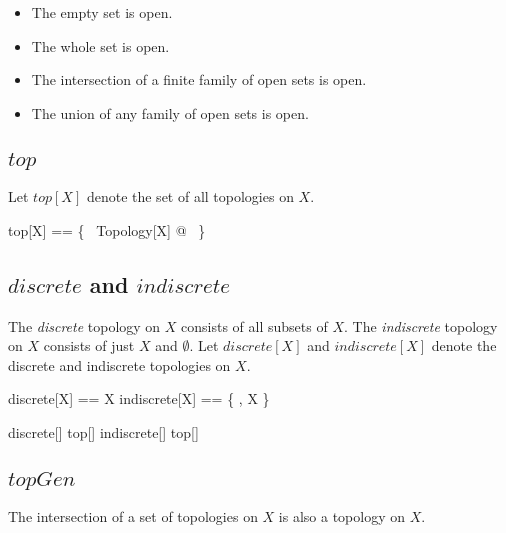 \documentclass[11pt, oneside]{article}
\begin{document}
\begin{itemize}
\item The empty set is open.
\item The whole set is open.
\item The intersection of a finite family of open sets is open.
\item The union of any family of open sets is open. 
\end{itemize}

\subsection{$top$}

Let $top[X]$ denote the set of all topologies on $X$.

\begin{zed}
	top[X] == \{~ Topology[X] @ \tau ~\}
\end{zed}

\subsection{$discrete$ and $indiscrete$}

The {\it discrete} topology on $X$ consists of all subsets of $X$.
The {\it indiscrete} topology on $X$ consists of just $X$ and $\emptyset$.
Let $discrete[X]$ and $indiscrete[X]$ denote the discrete and indiscrete topologies on $X$.

\begin{zed}
	discrete[X] == \power X
\also
	indiscrete[X] ==  \{ \emptyset, X \}
\end{zed}

\begin{example}

\begin{zed}
	discrete[\nat] \in top[\nat] 
\also
	indiscrete[\nat] \in top[\nat]
\end{zed}

\end{example}

\subsection{$topGen$}

\begin{remark}

The intersection of a set of topologies on $X$ is also a topology on $X$.

\end{remark}
\end{document}
